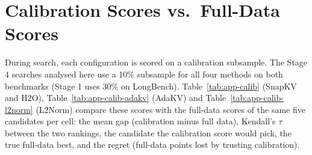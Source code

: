 \section{Calibration Scores vs.\ Full-Data Scores}
\label{app:calib}

During search, each configuration is scored on a calibration subsample. The Stage 4 searches analysed here use a 10\% subsample for all four methods on both benchmarks (Stage 1 uses 30\% on LongBench). Table~\ref{tab:app-calib} (SnapKV and H2O), Table~\ref{tab:app-calib-adakv} (AdaKV) and Table~\ref{tab:app-calib-l2norm} (L2Norm) compare these scores with the full-data scores of the same five candidates per cell: the mean gap (calibration minus full data), Kendall's $\tau$ between the two rankings, the candidate the calibration score would pick, the true full-data best, and the regret (full-data points lost by trusting calibration).


